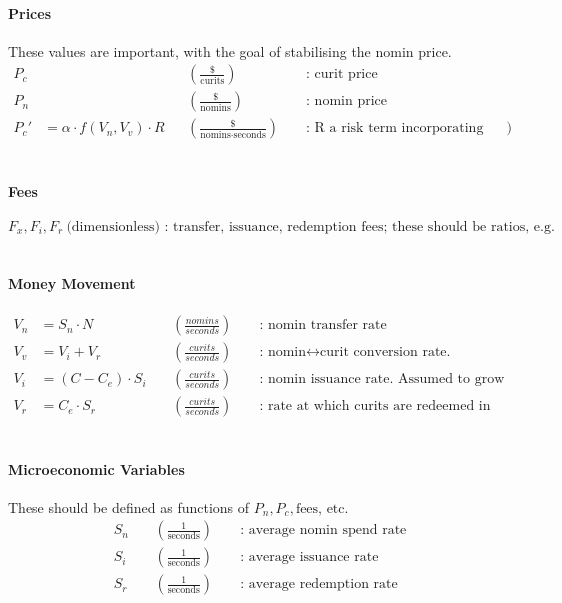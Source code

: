 \documentclass{article}
\begin{document}
\paragraph{Prices} These values are important, with the goal of stabilising the nomin price.
\begin{align*}
    P_c & \ && (\frac{\text{\$}}{\text{curits}}) && \text{ : curit price} \\
    P_n & \ && (\frac{\text{\$}}{\text{nomins}}) && \text{ : nomin price} \\
    P_c' &= \alpha \cdot f(V_n, V_v) \cdot R && (\frac{\text{\$}}{\text{nomins} \cdot \text{seconds}}) && \text{ : R a risk term incorporating volatility? \#buyers - \#sellers?})
\end{align*}
\\

\paragraph{Fees}
\[F_x, F_i, F_r \ \text{(dimensionless) : transfer, issuance, redemption fees; these should be ratios, e.g. 0.1\%}\]
\\

\paragraph{Money Movement}
\begin{align*}
    V_n &= S_n \cdot N \ && (\frac{nomins}{seconds}) && \text{ : nomin transfer rate} \\
    V_v &= V_i + V_r \ && (\frac{curits}{seconds}) && \text{ : nomin} \leftrightarrow \text{curit conversion rate.} \\
    V_i &= (C - C_e) \cdot S_i \ && (\frac{curits}{seconds}) && \text{ : nomin issuance rate. Assumed to grow as there are more free curits in the system (actually should probably grow with the number of escrowed but unissued nomins).} \\
    V_r &= C_e \cdot S_r \ && (\frac{curits}{seconds}) && \text{ : rate at which curits are redeemed in return for nomins (which are burned). Assumed to grow proportionally with the number of escrowed curits.}
\end{align*}
\\

\paragraph{Microeconomic Variables} These should be defined as functions of \(P_n, P_c, \text{fees, etc.}\)
\begin{align*}
S_n \ && (\frac{1}{\text{seconds}}) && \text{ : average nomin spend rate} \\
S_i \ && (\frac{1}{\text{seconds}}) && \text{ : average issuance rate} \\
S_r \ && (\frac{1}{\text{seconds}}) && \text{ : average redemption rate}
\end{align*}
\end{document}
